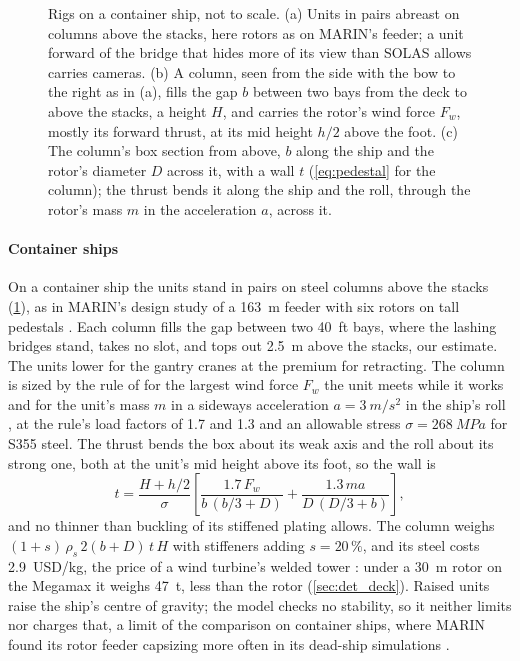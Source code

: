 \begin{figure}[tbp]
\centering

\caption{Rigs on a container ship, not to scale. (a) Units in pairs abreast on columns above the stacks, here rotors as on MARIN's feeder; a unit forward of the bridge that hides more of its view than SOLAS allows carries cameras. (b) A column, seen from the side with the bow to the right as in (a), fills the gap $b$ between two bays from the deck to above the stacks, a height $H$, and carries the rotor's wind force $F_w$, mostly its forward thrust, at its mid height $h/2$ above the foot. (c) The column's box section from above, $b$ along the ship and the rotor's diameter $D$ across it, with a wall $t$ (\cref{eq:pedestal} for the column); the thrust bends it along the ship and the roll, through the rotor's mass $m$ in the acceleration $a$, across it.}
\label{fig:container_rigs}
\end{figure}

\paragraph{Container ships} On a container ship the units stand in pairs on steel columns above the stacks (\cref{fig:container_rigs}), as in MARIN's design study of a \SI{163}{m} feeder with six rotors on tall pedestals \citep{marin2025feeder}.  Each column fills the gap between two \SI{40}{ft} bays, where the lashing bridges stand, takes no slot, and tops out \SI{2.5}{m} above the stacks, our estimate. The units lower for the gantry cranes at the premium for retracting. The column is sized by the rule of \citet{bv2026nr206} for the largest wind force $F_w$ the unit meets while it works and for the unit's mass $m$ in a sideways acceleration $a=\SI{3}{m/s^2}$ in the ship's roll \citep{marin2025feeder}, at the rule's load factors of 1.7 and 1.3 and an allowable stress $\sigma=\SI{268}{MPa}$ for S355 steel. The thrust bends the box about its weak axis and the roll about its strong one, both at the unit's mid height above its foot, so the wall is
\begin{equation}
t = \frac{H + h/2}{\sigma}\left[\frac{1.7\,F_w}{b\,(b/3 + D)} + \frac{1.3\,m a}{D\,(D/3 + b)}\right],
\label{eq:pedestal}
\end{equation}
and no thinner than buckling of its stiffened plating allows. The column weighs $(1+s)\,\rho_s\,2(b+D)\,t\,H$ with stiffeners adding $s=20\,\%$, and its steel costs \SI{2.9}{USD/kg}, the price of a wind turbine's welded tower \citep{wisdem_csm}: under a \SI{30}{m} rotor on the Megamax it weighs \SI{47}{t}, less than the rotor (\cref{sec:det_deck}). Raised units raise the ship's centre of gravity; the model checks no stability, so it neither limits nor charges that, a limit of the comparison on container ships, where MARIN found its rotor feeder capsizing more often in its dead-ship simulations \citep{marin2025feeder}.

